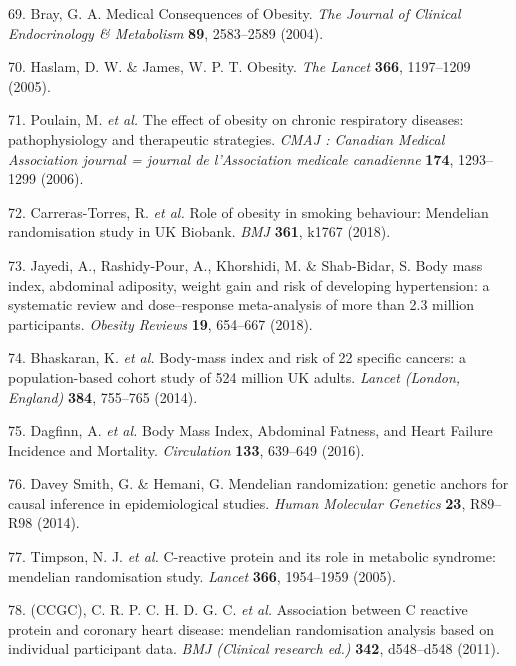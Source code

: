 \documentclass[11pt,twoside]{bristolthesis}
\begin{document}
\leavevmode\hypertarget{ref-Bray2004}{}%
69. Bray, G. A. Medical Consequences of Obesity. \emph{The Journal of Clinical Endocrinology \& Metabolism} \textbf{89}, 2583--2589 (2004).

\leavevmode\hypertarget{ref-Haslam2005}{}%
70. Haslam, D. W. \& James, W. P. T. Obesity. \emph{The Lancet} \textbf{366}, 1197--1209 (2005).

\leavevmode\hypertarget{ref-Poulain2006}{}%
71. Poulain, M. \emph{et al.} The effect of obesity on chronic respiratory diseases: pathophysiology and therapeutic strategies. \emph{CMAJ : Canadian Medical Association journal = journal de l'Association medicale canadienne} \textbf{174}, 1293--1299 (2006).

\leavevmode\hypertarget{ref-Carreras-Torres2018}{}%
72. Carreras-Torres, R. \emph{et al.} Role of obesity in smoking behaviour: Mendelian randomisation study in UK Biobank. \emph{BMJ} \textbf{361}, k1767 (2018).

\leavevmode\hypertarget{ref-Jayedi2018}{}%
73. Jayedi, A., Rashidy-Pour, A., Khorshidi, M. \& Shab-Bidar, S. Body mass index, abdominal adiposity, weight gain and risk of developing hypertension: a systematic review and dose--response meta-analysis of more than 2.3 million participants. \emph{Obesity Reviews} \textbf{19}, 654--667 (2018).

\leavevmode\hypertarget{ref-Bhaskaran2014}{}%
74. Bhaskaran, K. \emph{et al.} Body-mass index and risk of 22 specific cancers: a population-based cohort study of 524 million UK adults. \emph{Lancet (London, England)} \textbf{384}, 755--765 (2014).

\leavevmode\hypertarget{ref-Dagfinn2016}{}%
75. Dagfinn, A. \emph{et al.} Body Mass Index, Abdominal Fatness, and Heart Failure Incidence and Mortality. \emph{Circulation} \textbf{133}, 639--649 (2016).

\leavevmode\hypertarget{ref-DaveySmith2014}{}%
76. Davey Smith, G. \& Hemani, G. Mendelian randomization: genetic anchors for causal inference in epidemiological studies. \emph{Human Molecular Genetics} \textbf{23}, R89--R98 (2014).

\leavevmode\hypertarget{ref-Timpson2005}{}%
77. Timpson, N. J. \emph{et al.} C-reactive protein and its role in metabolic syndrome: mendelian randomisation study. \emph{Lancet} \textbf{366}, 1954--1959 (2005).

\leavevmode\hypertarget{ref-CCGC2011}{}%
78. (CCGC), C. R. P. C. H. D. G. C. \emph{et al.} Association between C reactive protein and coronary heart disease: mendelian randomisation analysis based on individual participant data. \emph{BMJ (Clinical research ed.)} \textbf{342}, d548--d548 (2011).
\end{document}
